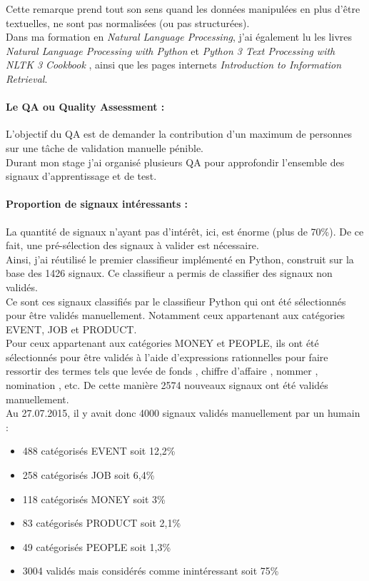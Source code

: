             Cette remarque prend tout son sens quand les données manipulées en plus d'être textuelles, ne sont pas normalisées (ou pas structurées).\\

            Dans ma formation en \textit{Natural Language Processing}, j'ai également lu les livres \textit{Natural Language Processing with Python}\autocite{nlp_p} et \textit{Python 3 Text Processing with NLTK 3 Cookbook}\autocite{nltk} , ainsi que les pages internets \textit{Introduction to Information Retrieval}\autocite{ir_web}.


            \paragraph{Le QA ou Quality Assessment :}
                L'objectif du QA est de demander la contribution d'un maximum de personnes sur une tâche de validation manuelle pénible.\\
                Durant mon stage j'ai organisé plusieurs QA pour approfondir l'ensemble des signaux d’apprentissage et de test.

            \paragraph{Proportion de signaux intéressants :}
                La quantité de signaux n'ayant pas d'intérêt, ici, est énorme (plus de 70\%). De ce fait, une pré-sélection des signaux à valider est nécessaire.\\
                Ainsi, j'ai réutilisé le premier classifieur implémenté en Python, construit sur la base des 1426 signaux. Ce classifieur a permis de classifier des signaux non validés.\\
                Ce sont ces signaux classifiés par le classifieur Python qui ont été sélectionnés pour être validés manuellement. Notamment ceux appartenant aux catégories EVENT, JOB et PRODUCT.\\
                Pour ceux appartenant aux catégories MONEY et PEOPLE, ils ont été sélectionnés pour être validés à l'aide d'expressions rationnelles pour faire ressortir des termes tels que \og levée de fonds \fg, \og chiffre d'affaire \fg, \og nommer \fg, \og nomination \fg, etc.
                De cette manière 2574 nouveaux signaux ont été validés manuellement.\\

            Au 27.07.2015, il y avait donc 4000 signaux validés manuellement par un humain :
            \begin{itemize}
                \item 488 catégorisés EVENT soit 12,2\%
                \item 258 catégorisés JOB soit 6,4\%
                \item 118 catégorisés MONEY soit 3\%
                \item 83 catégorisés PRODUCT soit 2,1\%
                \item 49 catégorisés PEOPLE soit 1,3\%
                \item 3004 validés mais considérés comme inintéressant soit 75\%
            \end{itemize}
